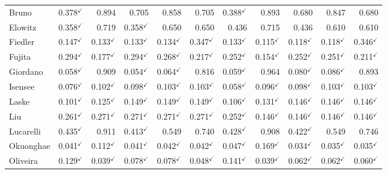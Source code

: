 \begin{longtable}{@{}lrrrrr|rrrrr@{}}
Bruno & 0.378$^{\checkmark}$ & 0.894 & 0.705 & 0.858 & 0.705 & 0.388$^{\checkmark}$ & 0.893 & 0.680 & 0.847 & 0.680 \\
Elowitz & 0.358$^{\checkmark}$ & 0.719 & 0.358$^{\checkmark}$ & 0.650 & 0.650 & 0.436 & 0.715 & 0.436 & 0.610 & 0.610 \\
Fiedler & 0.147$^{\checkmark}$ & 0.133$^{\checkmark}$ & 0.133$^{\checkmark}$ & 0.134$^{\checkmark}$ & 0.347$^{\checkmark}$ & 0.133$^{\checkmark}$ & 0.115$^{\checkmark}$ & 0.118$^{\checkmark}$ & 0.118$^{\checkmark}$ & 0.346$^{\checkmark}$ \\
Fujita & 0.294$^{\checkmark}$ & 0.177$^{\checkmark}$ & 0.294$^{\checkmark}$ & 0.268$^{\checkmark}$ & 0.217$^{\checkmark}$ & 0.252$^{\checkmark}$ & 0.154$^{\checkmark}$ & 0.252$^{\checkmark}$ & 0.251$^{\checkmark}$ & 0.211$^{\checkmark}$ \\
Giordano & 0.058$^{\checkmark}$ & 0.909 & 0.054$^{\checkmark}$ & 0.064$^{\checkmark}$ & 0.816 & 0.059$^{\checkmark}$ & 0.964 & 0.080$^{\checkmark}$ & 0.086$^{\checkmark}$ & 0.893 \\
Isensee & 0.076$^{\checkmark}$ & 0.102$^{\checkmark}$ & 0.098$^{\checkmark}$ & 0.103$^{\checkmark}$ & 0.103$^{\checkmark}$ & 0.058$^{\checkmark}$ & 0.096$^{\checkmark}$ & 0.098$^{\checkmark}$ & 0.103$^{\checkmark}$ & 0.103$^{\checkmark}$ \\
Laske & 0.101$^{\checkmark}$ & 0.125$^{\checkmark}$ & 0.149$^{\checkmark}$ & 0.149$^{\checkmark}$ & 0.149$^{\checkmark}$ & 0.106$^{\checkmark}$ & 0.131$^{\checkmark}$ & 0.146$^{\checkmark}$ & 0.146$^{\checkmark}$ & 0.146$^{\checkmark}$ \\
Liu & 0.261$^{\checkmark}$ & 0.271$^{\checkmark}$ & 0.271$^{\checkmark}$ & 0.271$^{\checkmark}$ & 0.271$^{\checkmark}$ & 0.252$^{\checkmark}$ & 0.146$^{\checkmark}$ & 0.146$^{\checkmark}$ & 0.146$^{\checkmark}$ & 0.146$^{\checkmark}$ \\
Lucarelli & 0.435$^{\checkmark}$ & 0.911 & 0.413$^{\checkmark}$ & 0.549 & 0.740 & 0.428$^{\checkmark}$ & 0.908 & 0.422$^{\checkmark}$ & 0.549 & 0.746 \\
Okuonghae & 0.041$^{\checkmark}$ & 0.112$^{\checkmark}$ & 0.041$^{\checkmark}$ & 0.042$^{\checkmark}$ & 0.042$^{\checkmark}$ & 0.047$^{\checkmark}$ & 0.169$^{\checkmark}$ & 0.034$^{\checkmark}$ & 0.035$^{\checkmark}$ & 0.035$^{\checkmark}$ \\
Oliveira & 0.129$^{\checkmark}$ & 0.039$^{\checkmark}$ & 0.078$^{\checkmark}$ & 0.078$^{\checkmark}$ & 0.048$^{\checkmark}$ & 0.141$^{\checkmark}$ & 0.039$^{\checkmark}$ & 0.062$^{\checkmark}$ & 0.062$^{\checkmark}$ & 0.060$^{\checkmark}$ \\

\end{longtable}
